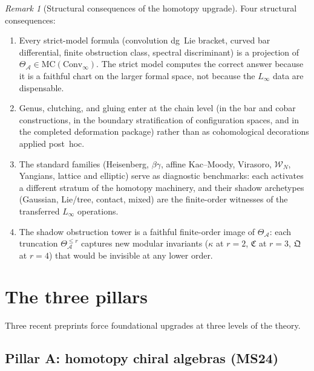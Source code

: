 \documentclass[11pt]{report}
\theoremstyle{definition}
\theoremstyle{remark}
\newtheorem{remark}[theorem]{Remark}
\providecommand{\cA}{\mathcal{A}}
\providecommand{\MC}{\mathrm{MC}}
\providecommand{\Convinf}{\mathrm{Conv}_\infty}
\numberwithin{equation}{section}
\begin{document}
\begin{remark}[Structural consequences of the homotopy upgrade]
\label{rem:structural-consequences-homotopy}
Four structural consequences:
\begin{enumerate}[label=\textup{(\roman*)}]
\item Every strict-model formula (convolution dg~Lie bracket,
 curved bar differential, finite obstruction class, spectral
 discriminant) is a projection of
 $\Theta_\cA \in \MC(\Convinf)$. The strict model computes
 the correct answer because it is a faithful chart on the larger
 formal space, not because the $L_\infty$ data are dispensable.
\item Genus, clutching, and gluing enter at the chain level (in the
 bar and cobar constructions, in the boundary stratification of
 configuration spaces, and in the completed deformation
 package) rather than as cohomological decorations applied post~hoc.
\item The standard families (Heisenberg, $\beta\gamma$, affine
 Kac--Moody, Virasoro, $\mathcal{W}_N$, Yangians, lattice and
 elliptic) serve as diagnostic benchmarks: each activates a
 different stratum of the homotopy machinery, and their shadow
 archetypes (Gaussian, Lie/tree, contact, mixed) are the
 finite-order witnesses of the transferred $L_\infty$ operations.
\item The shadow obstruction tower is a faithful finite-order
 image of $\Theta_\cA$: each truncation
 $\Theta_\cA^{\le r}$ captures new modular invariants
 ($\kappa$ at $r{=}2$, $\mathfrak{C}$ at $r{=}3$,
 $\mathfrak{Q}$ at $r{=}4$) that would be invisible at any lower
 order.
\end{enumerate}
\end{remark}


\section{The three pillars}
\label{sec:three-pillars-intro}

Three recent preprints force foundational upgrades at three levels of the theory.

\subsection{Pillar A: homotopy chiral algebras (MS24)}
\label{subsec:pillar-a}
\end{document}
